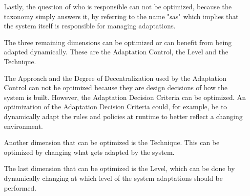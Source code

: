 \noindent Lastly, the question of who is responsible can not be optimized, because the taxonomy simply answers it,
by referring to the name "\acrshort{sas}" which implies that the system itself is responsible for managing adaptations.

\noindent The three remaining dimensions can be optimized or can benefit from being adapted dynamically.
These are the Adaptation Control, the Level and the Technique.

\noindent The Approach and the Degree of Decentralization used by the Adaptation Control can not be optimized 
because they are design decisions of how the system is built.
However, the Adaptation Decision Criteria can be optimized. An optimization of the Adaptation Decision Criteria
could, for example, be to dynamically adapt the rules and policies at runtime to better reflect a changing environment.

\noindent Another dimension that can be optimized is the Technique. 
This can be optimized by changing what gets adapted by the system.

\noindent The last dimension that can be optimized is the Level, which can be done by dynamically changing at which level of the system
adaptations should be performed.